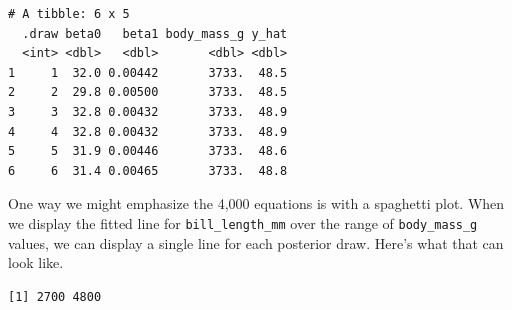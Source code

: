 \documentclass[
  letterpaper,
  DIV=11,
  numbers=noendperiod]{scrartcl}
\newenvironment{Shaded}{\begin{snugshade}}{\end{snugshade}}
\newcommand{\AttributeTok}[1]{\textcolor[rgb]{0.40,0.45,0.13}{#1}}
\newcommand{\CommentTok}[1]{\textcolor[rgb]{0.37,0.37,0.37}{#1}}
\newcommand{\FunctionTok}[1]{\textcolor[rgb]{0.28,0.35,0.67}{#1}}
\newcommand{\NormalTok}[1]{\textcolor[rgb]{0.00,0.23,0.31}{#1}}
\newcommand{\SpecialCharTok}[1]{\textcolor[rgb]{0.37,0.37,0.37}{#1}}
\begin{document}
\begin{Shaded}
\end{Shaded}

\begin{verbatim}
# A tibble: 6 x 5
  .draw beta0   beta1 body_mass_g y_hat
  <int> <dbl>   <dbl>       <dbl> <dbl>
1     1  32.0 0.00442       3733.  48.5
2     2  29.8 0.00500       3733.  48.5
3     3  32.8 0.00432       3733.  48.9
4     4  32.8 0.00432       3733.  48.9
5     5  31.9 0.00446       3733.  48.6
6     6  31.4 0.00465       3733.  48.8
\end{verbatim}

One way we might emphasize the 4,000 equations is with a spaghetti plot.
When we display the fitted line for \texttt{bill\_length\_mm} over the
range of \texttt{body\_mass\_g} values, we can display a single line for
each posterior draw. Here's what that can look like.

\begin{Shaded}
\end{Shaded}

\begin{verbatim}
[1] 2700 4800
\end{verbatim}
\end{document}
